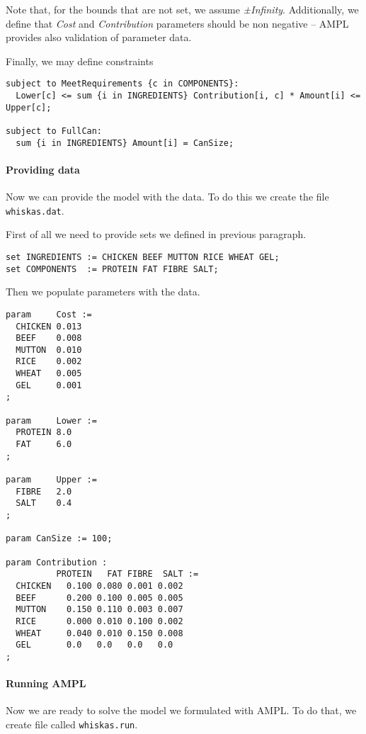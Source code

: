 Note that, for the bounds that are not set, we assume \emph{±Infinity}. Additionally, we define that \emph{Cost} and \emph{Contribution} parameters should be non negative -- AMPL provides also validation of parameter data.


Finally, we may define constraints

\begin{lstlisting}
subject to MeetRequirements {c in COMPONENTS}:
  Lower[c] <= sum {i in INGREDIENTS} Contribution[i, c] * Amount[i] <= Upper[c];
  
subject to FullCan: 
  sum {i in INGREDIENTS} Amount[i] = CanSize;
\end{lstlisting}

\paragraph{Providing data}

Now we can provide the model with the data. To do this we create the file \texttt{whiskas.dat}.

First of all we need to provide sets we defined in previous paragraph.
\begin{lstlisting}
set INGREDIENTS := CHICKEN BEEF MUTTON RICE WHEAT GEL;
set COMPONENTS  := PROTEIN FAT FIBRE SALT;
\end{lstlisting}

Then we populate parameters with the data.
\begin{lstlisting}
param     Cost :=
  CHICKEN 0.013
  BEEF    0.008
  MUTTON  0.010
  RICE    0.002
  WHEAT   0.005
  GEL     0.001
;

param     Lower :=
  PROTEIN 8.0
  FAT     6.0
;

param     Upper :=
  FIBRE   2.0
  SALT    0.4
;

param CanSize := 100;

param Contribution :
          PROTEIN   FAT FIBRE  SALT :=
  CHICKEN   0.100 0.080 0.001 0.002 
  BEEF      0.200 0.100 0.005 0.005 
  MUTTON    0.150 0.110 0.003 0.007 
  RICE      0.000 0.010 0.100 0.002 
  WHEAT     0.040 0.010 0.150 0.008 
  GEL       0.0   0.0   0.0   0.0   
;
\end{lstlisting} 

\paragraph{Running AMPL}

Now we are ready to solve the model we formulated with AMPL. To do that, we create file called \texttt{whiskas.run}.

